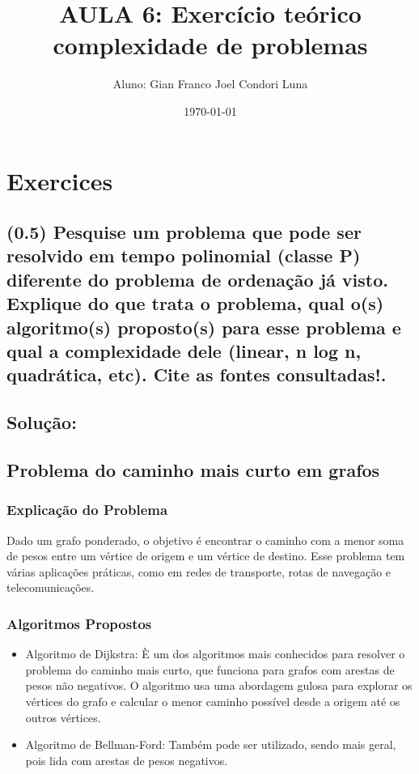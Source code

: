 \documentclass{article}
\title{AULA 6: Exercício teórico complexidade de problemas}
\author{Aluno: Gian Franco Joel Condori Luna}
\date{\today}
\begin{document}
\maketitle

\section*{Exercices}
\setcounter{section}{1}
\subsection {(0.5) Pesquise um problema que pode ser resolvido em tempo polinomial (classe P)
diferente do problema de ordenação já visto. Explique do que trata o problema, qual
o(s) algoritmo(s) proposto(s) para esse problema e qual a complexidade dele (linear, n
log n, quadrática, etc). Cite as fontes consultadas!.}

\subsection*{Solução:}

\subsection*{Problema do caminho mais curto em grafos}

\subsubsection{Explicação do Problema}
Dado um grafo ponderado, o objetivo é encontrar o caminho com a menor soma de 
pesos entre um vértice de origem e um vértice de destino. Esse problema tem 
várias aplicações práticas, como em redes de transporte, rotas de navegação e 
telecomunicações.

\subsubsection{Algoritmos Propostos}
\begin{itemize}
    \item Algoritmo de Dijkstra: È um dos algoritmos mais conhecidos para 
    resolver o problema do caminho mais curto, que funciona para grafos 
    com arestas de pesos não negativos. O algoritmo usa uma abordagem gulosa 
    para explorar os vértices do grafo e calcular o menor caminho possível desde 
    a origem até os outros vértices. 
    \item Algoritmo de Bellman-Ford: Também pode ser utilizado, sendo mais geral, 
    pois lida com arestas de pesos negativos.
\end{itemize}
\end{document}
